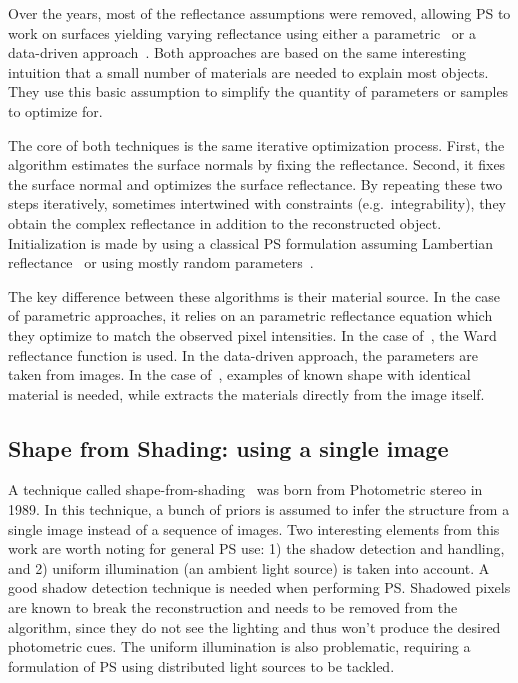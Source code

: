 Over the years, most of the reflectance assumptions were removed, allowing PS to work on surfaces yielding varying reflectance using either a parametric~\cite{goldman-tpami-10} or a data-driven approach~\cite{hertzmann-pami-05,alldrin-cvpr-08}. Both approaches are based on the same interesting intuition that a small number of materials are needed to explain most objects. They use this basic assumption to simplify the quantity of parameters or samples to optimize for.

The core of both techniques is the same iterative optimization process. First, the algorithm estimates the surface normals by fixing the reflectance. Second, it fixes the surface normal and optimizes the surface reflectance. By repeating these two steps iteratively, sometimes intertwined with constraints (e.g.\ integrability), they obtain the complex reflectance in addition to the reconstructed object. Initialization is made by using a classical PS formulation assuming Lambertian reflectance~\cite{goldman-tpami-10} or using mostly random parameters~\cite{alldrin-cvpr-08}.

The key difference between these algorithms is their material source. In the case of parametric approaches, it relies on an parametric reflectance equation which they optimize to match the observed pixel intensities. In the case of~\cite{goldman-tpami-10}, the Ward reflectance function is used. In the data-driven approach, the parameters are taken from images. In the case of~\cite{hertzmann-pami-05}, examples of known shape with identical material is needed, while \cite{alldrin-cvpr-08} extracts the materials directly from the image itself.


\subsection{Shape from Shading: using a single image}
A technique called shape-from-shading~\cite{Horn1989} was born from Photometric stereo in 1989. In this technique, a bunch of priors is assumed to infer the structure from a single image instead of a sequence of images. Two interesting elements from this work are worth noting for general PS use: 1) the shadow detection and handling, and 2) uniform illumination (an ambient light source) is taken into account. A good shadow detection technique is needed when performing PS. Shadowed pixels are known to break the reconstruction and needs to be removed from the algorithm, since they do not see the lighting and thus won't produce the desired photometric cues. The uniform illumination is also problematic, requiring a formulation of PS using distributed light sources to be tackled.

